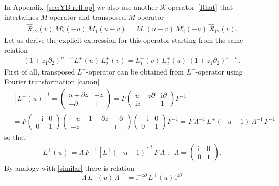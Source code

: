 \documentclass[11pt]{article}
\numberwithin{equation}{section}
\theoremstyle{plain}
\theoremstyle{definition}
\def\dd{\partial}
\renewcommand{\imath}{\mathrm{i}}
\begin{document}
In Appendix~\ref{sec:YB-refl-op} we also use another $\mathcal{R}$-operator~\eqref{Rhat} that intertwines $M$-operator and transposed $M$-operator  
\begin{align}\label{RMtM-2}
	\widehat{\mathcal{R}}_{12}(v) \, M_2^t(-u) \, M_1(u - v) = M_1(u - v) \, M_2^t(-u) \, \widehat{\mathcal{R}}_{12}(v).
\end{align}
Let us derive the explicit expression for this operator 
starting from the same relation  
\begin{align*}
	(1+z_{1} \dd_{2})^{u-v} \,
	L^{+}_{1}(u) \, L^{+}_{2}(v) =
	L^{+}_{1}(v)\, L^{+}_{2}(u) \,
	(1+z_{1} \dd_{2})^{u-v}\,.
\end{align*} 
First of all, transposed $L^{+}$-operator can be obtained from 
$L^{+}$-operator using Fourier transformation \eqref{canon} 
\begin{align*}
	&\left[L^+(u)\right]^t = \left(\begin{array}{cc}
		u + \dd z & -z \\
		-\dd & 1\end{array}\right) = F \left(\begin{array}{cc}
		u - z\dd & \imath \dd \\
		\imath z & 1\end{array}\right) F^{-1} \\ 
	&= F \left(\begin{array}{cc}
		-\imath & 0 \\
		0 & 1\end{array}\right) 
	\left(\begin{array}{cc}
		-u-1 + \dd z & -\dd \\
		- z & 1\end{array}\right) 
	\left(\begin{array}{cc}
		-\imath & 0 \\
		0 & 1 \end{array}\right) F^{-1}  
	= F\,\Lambda^{-1}\, 
	L^+(-u-1)\,\Lambda^{-1}\, F^{-1}
\end{align*}
so that 
\begin{align}
	L^+(u)\, = \Lambda\,F^{-1}\,
	\left[L^+(-u-1)\right]^t\,F\,
	\Lambda \ \ ;\ \  \Lambda = \left(\begin{array}{cc}
		\imath & 0 \\
		0 & 1 \end{array}\right).
\end{align}
By analogy with \eqref{similar} there is relation 
$$ 
\Lambda\,L^{+}(u)\,\Lambda^{-1} = \imath^{-z\partial}\,L^{+}(u)\,\imath^{z\partial}
$$
\end{document}
